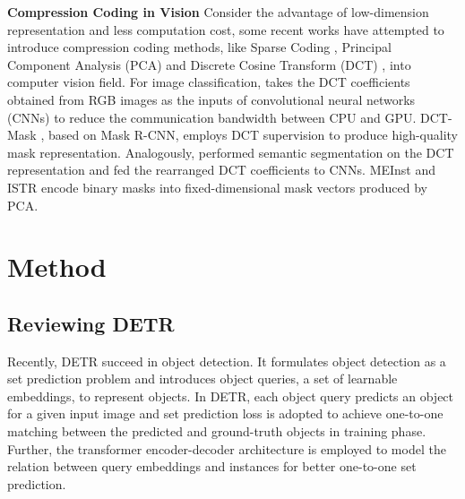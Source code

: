 \documentclass{article}
\begin{document}
\textbf{Compression Coding in Vision}
Consider the advantage of low-dimension representation and less computation cost, some recent works have attempted to introduce compression coding methods, like Sparse Coding \cite{donoho2006compressed}, Principal Component Analysis (PCA) \cite{wold1987principal} and Discrete Cosine Transform (DCT) \cite{ahmed1974discrete}, into computer vision field. For image classification, \cite{xu2020learn_in_freq} takes the DCT coefficients obtained from RGB images as the inputs of convolutional neural networks (CNNs) to reduce the communication bandwidth between CPU and GPU. DCT-Mask \cite{shen2020dct},  based on Mask R-CNN, employs DCT supervision to produce high-quality mask representation. Analogously, \cite{lo2019exploring} performed semantic segmentation on the DCT representation and fed the rearranged DCT coefficients to CNNs. MEInst \cite{zhang2020meinst} and ISTR \cite{hu2021istr} encode binary masks into fixed-dimensional mask vectors produced by PCA.

\section{Method}
\subsection{Reviewing DETR}
Recently, DETR \cite{carion2020detr} succeed in object detection. It formulates object detection as a set prediction problem and introduces object queries, a set of learnable embeddings, to represent objects. In DETR, each object query predicts an object for a given input image and set prediction loss is adopted to achieve one-to-one matching between the predicted and ground-truth objects in training phase. Further, the transformer encoder-decoder architecture is employed to model the relation between query embeddings and instances for better one-to-one set prediction.
\end{document}
